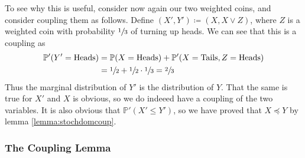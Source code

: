 	To see why this is useful, consider now again our two weighted coins, and consider coupling 
	them as follows. Define $(X', Y') \coloneqq (X, X \lor Z)$, where $Z$ is a weighted coin 
	with probability $\sfrac{1}{3}$ of turning up heads. We can see that this is a coupling as 
	\begin{align*}
		\mathbb{P}'(Y' = \mathrm{Heads}) &= \mathbb{P}(X=\mathrm{Heads}) + 
		\mathbb{P'}(X = \mathrm{Tails}, Z = \mathrm{Heads}) \\
		&= \sfrac{1}{2} + \sfrac{1}{2} \cdot \sfrac{1}{3} = \sfrac{2}{3}
	\end{align*}
	Thus the marginal distribution of $Y'$ is the distribution of $Y$. That the same is true for
	$X'$ and $X$ is obvious, so we do indeeed have a coupling of the two variables. It is also
	obvious that $\mathbb{P}'(X' \leq Y')$, so we have proved that $X \preccurlyeq Y$ by lemma 
	\ref{lemma:stochdomcoup}.

	\subsubsection{The Coupling Lemma}

